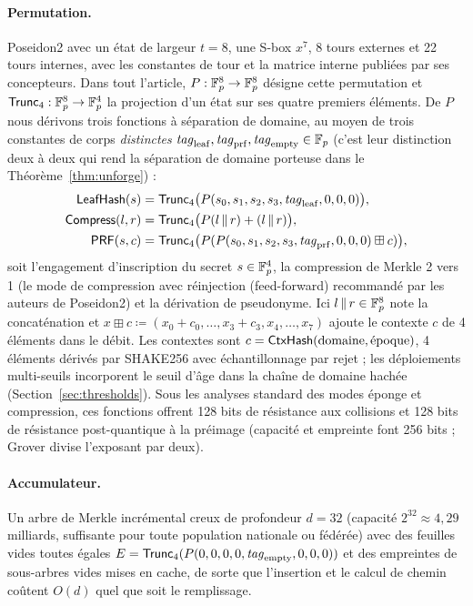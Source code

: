 \documentclass[11pt]{article}
\theoremstyle{definition}
\begin{document}
\paragraph{Permutation.} Poseidon2 \cite{poseidon2} avec un état de largeur $t = 8$, une
S-box $x^7$, 8 tours externes et 22 tours internes, avec les constantes de tour et la
matrice interne publiées par ses concepteurs. Dans tout l'article, $P : \mathbb{F}_p^8 \to \mathbb{F}_p^8$
désigne cette permutation et $\mathsf{Trunc}_4 : \mathbb{F}_p^8 \to \mathbb{F}_p^4$ la projection d'un état sur ses
quatre premiers éléments. De $P$ nous dérivons trois fonctions à séparation de domaine, au moyen de trois
constantes de corps \emph{distinctes} $\mathit{tag}_{\mathrm{leaf}},
\mathit{tag}_{\mathrm{prf}}, \mathit{tag}_{\mathrm{empty}} \in \mathbb{F}_p$ (c'est leur distinction
deux à deux qui rend la séparation de domaine porteuse dans le
Théorème~\ref{thm:unforge}) :
\begin{align*}
\mathsf{LeafHash}(s) &= \mathsf{Trunc}_4\bigl(P(s_0, s_1, s_2, s_3, \mathit{tag}_{\mathrm{leaf}}, 0, 0, 0)\bigr),\\
\mathsf{Compress}(l, r) &= \mathsf{Trunc}_4\bigl(P(l \,\|\, r) + (l \,\|\, r)\bigr),\\
\mathsf{PRF}(s, c) &= \mathsf{Trunc}_4\bigl(P(P(s_0, s_1, s_2, s_3, \mathit{tag}_{\mathrm{prf}}, 0, 0, 0) \boxplus c)\bigr),
\end{align*}
soit l'engagement d'inscription du secret $s \in \mathbb{F}_p^4$, la compression de Merkle 2 vers 1
(le mode de compression avec réinjection (feed-forward) recommandé par les auteurs de
Poseidon2) et la dérivation de pseudonyme. Ici $l \,\|\, r \in \mathbb{F}_p^8$ note la
concaténation et $x \boxplus c \coloneqq (x_0 + c_0, \ldots, x_3 + c_3, x_4, \ldots, x_7)$
ajoute le contexte $c$ de 4
éléments dans le débit. Les contextes sont $c = \mathsf{CtxHash}(\mathrm{domaine},
\mathrm{\acute{e}poque})$, 4 éléments dérivés par SHAKE256 avec échantillonnage par rejet
; les déploiements multi-seuils incorporent le seuil d'âge dans la chaîne de domaine
hachée (Section~\ref{sec:thresholds}).
Sous les analyses standard des modes éponge et compression, ces fonctions offrent 128 bits
de résistance aux collisions et 128 bits de résistance post-quantique à la préimage
(capacité et empreinte font 256 bits ; Grover \cite{grover} divise l'exposant par deux).

\paragraph{Accumulateur.} Un arbre de Merkle incrémental creux \cite{merkle} de profondeur
$d = 32$ (capacité $2^{32} \approx 4{,}29$ milliards, suffisante pour toute population
nationale ou fédérée) avec des feuilles vides toutes égales $E =
\mathsf{Trunc}_4(P(0,0,0,0,\mathit{tag}_{\mathrm{empty}},0,0,0))$ et des empreintes de sous-arbres
vides mises en cache, de sorte que l'insertion et le calcul de chemin coûtent $O(d)$ quel
que soit le remplissage.
\end{document}

